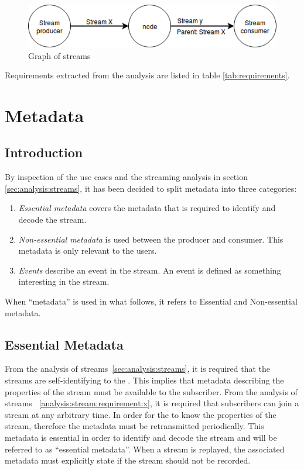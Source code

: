 \begin{figure}[h!]
	\centering
	\includegraphics[width=1\textwidth]{figures/stream-graph}
	\caption{Graph of streams} \label{fig:analysis:graph}
\end{figure}

Requirements extracted from the analysis are listed in table \ref{tab:requirements}.

\section{Metadata} \label{sec:analysis:metadata}
\subsection{Introduction}

By inspection of the use cases and the streaming analysis in section \ref{sec:analysis:streams}, it has been decided to split metadata into three categories:
\begin{enumerate}
	\item \textit{Essential metadata} covers the metadata that is required to identify and decode the stream.
	\item \textit{Non-essential metadata} is used between the producer and consumer. This metadata is only relevant to the users.
	\item \textit{Events} describe an event in the stream. An event is defined as something interesting in the stream.
\end{enumerate}

When ``metadata'' is used in what follows, it refers to Essential and Non-essential metadata.

\subsection{Essential Metadata} \label{sec:analysis:essentialmetadata}
From the analysis of streams~\ref{sec:analysis:streams}, it is required that the streams are self-identifying to the . This implies that metadata describing the properties of the stream must be available to the subscriber.
From the analysis of streams ~\ref{analysis:stream:requirement:x}, it is required that subscribers can join a stream at any arbitrary time. In order for the  to know the properties of the stream, therefore the metadata must be retransmitted periodically. This metadata is essential in order to identify and decode the stream and will be referred to as ``essential metadata''. When a stream is replayed, the associated metadata must explicitly state if the stream should not be recorded.



